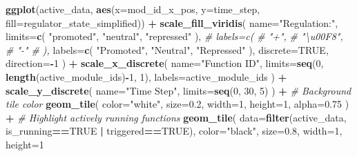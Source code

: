 \documentclass[]{book}
\newenvironment{Shaded}{\begin{snugshade}}{\end{snugshade}}
\newcommand{\CommentTok}[1]{\textcolor[rgb]{0.56,0.35,0.01}{\textit{#1}}}
\newcommand{\DataTypeTok}[1]{\textcolor[rgb]{0.13,0.29,0.53}{#1}}
\newcommand{\DecValTok}[1]{\textcolor[rgb]{0.00,0.00,0.81}{#1}}
\newcommand{\FloatTok}[1]{\textcolor[rgb]{0.00,0.00,0.81}{#1}}
\newcommand{\KeywordTok}[1]{\textcolor[rgb]{0.13,0.29,0.53}{\textbf{#1}}}
\newcommand{\NormalTok}[1]{#1}
\newcommand{\OperatorTok}[1]{\textcolor[rgb]{0.81,0.36,0.00}{\textbf{#1}}}
\newcommand{\OtherTok}[1]{\textcolor[rgb]{0.56,0.35,0.01}{#1}}
\newcommand{\StringTok}[1]{\textcolor[rgb]{0.31,0.60,0.02}{#1}}
\begin{document}
\begin{Shaded}
\begin{Highlighting}[]
\KeywordTok{ggplot}\NormalTok{(active_data, }\KeywordTok{aes}\NormalTok{(}\DataTypeTok{x=}\NormalTok{mod_id_x_pos, }\DataTypeTok{y=}\NormalTok{time_step, }\DataTypeTok{fill=}\NormalTok{regulator_state_simplified)) }\OperatorTok{+}
\StringTok{  }\KeywordTok{scale_fill_viridis}\NormalTok{(}
    \DataTypeTok{name=}\StringTok{"Regulation:"}\NormalTok{,}
    \DataTypeTok{limits=}\KeywordTok{c}\NormalTok{(}
      \StringTok{"promoted"}\NormalTok{,}
      \StringTok{"neutral"}\NormalTok{,}
      \StringTok{"repressed"}
\NormalTok{    ),}
    \CommentTok{# labels=c(}
    \CommentTok{#   "+",}
    \CommentTok{#   "\textbackslash{}u00F8",}
    \CommentTok{#   "-"}
    \CommentTok{# ),}
    \DataTypeTok{labels=}\KeywordTok{c}\NormalTok{(}
      \StringTok{"Promoted"}\NormalTok{,}
      \StringTok{"Neutral"}\NormalTok{,}
      \StringTok{"Repressed"}
\NormalTok{    ),}
    \DataTypeTok{discrete=}\OtherTok{TRUE}\NormalTok{,}
    \DataTypeTok{direction=}\OperatorTok{-}\DecValTok{1}
\NormalTok{  ) }\OperatorTok{+}
\StringTok{  }\KeywordTok{scale_x_discrete}\NormalTok{(}
    \DataTypeTok{name=}\StringTok{"Function ID"}\NormalTok{,}
    \DataTypeTok{limits=}\KeywordTok{seq}\NormalTok{(}\DecValTok{0}\NormalTok{, }\KeywordTok{length}\NormalTok{(active_module_ids)}\OperatorTok{-}\DecValTok{1}\NormalTok{, }\DecValTok{1}\NormalTok{),}
    \DataTypeTok{labels=}\NormalTok{active_module_ids}
\NormalTok{  ) }\OperatorTok{+}
\StringTok{  }\KeywordTok{scale_y_discrete}\NormalTok{(}
    \DataTypeTok{name=}\StringTok{"Time Step"}\NormalTok{,}
    \DataTypeTok{limits=}\KeywordTok{seq}\NormalTok{(}\DecValTok{0}\NormalTok{, }\DecValTok{30}\NormalTok{, }\DecValTok{5}\NormalTok{)}
\NormalTok{  ) }\OperatorTok{+}
\StringTok{  }\CommentTok{# Background tile color}
\StringTok{  }\KeywordTok{geom_tile}\NormalTok{(}
    \DataTypeTok{color=}\StringTok{"white"}\NormalTok{,}
    \DataTypeTok{size=}\FloatTok{0.2}\NormalTok{,}
    \DataTypeTok{width=}\DecValTok{1}\NormalTok{,}
    \DataTypeTok{height=}\DecValTok{1}\NormalTok{,}
    \DataTypeTok{alpha=}\FloatTok{0.75}
\NormalTok{  ) }\OperatorTok{+}
\StringTok{  }\CommentTok{# Highlight actively running functions}
\StringTok{  }\KeywordTok{geom_tile}\NormalTok{(}
    \DataTypeTok{data=}\KeywordTok{filter}\NormalTok{(active_data, is_running}\OperatorTok{==}\OtherTok{TRUE} \OperatorTok{|}\StringTok{ }\NormalTok{triggered}\OperatorTok{==}\OtherTok{TRUE}\NormalTok{),}
    \DataTypeTok{color=}\StringTok{"black"}\NormalTok{,}
    \DataTypeTok{size=}\FloatTok{0.8}\NormalTok{,}
    \DataTypeTok{width=}\DecValTok{1}\NormalTok{,}
    \DataTypeTok{height=}\DecValTok{1}

\end{Highlighting}
\end{Shaded}
\end{document}
